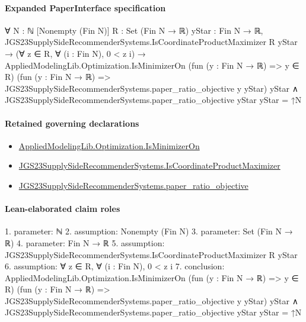 \documentclass[10pt]{article}
\begin{document}
\paragraph{Expanded PaperInterface specification}
\begin{ReviewVerbatim}
∀ {N : ℕ} [Nonempty (Fin N)] {R : Set (Fin N → ℝ)} {yStar : Fin N → ℝ},
  JGS23SupplySideRecommenderSystems.IsCoordinateProductMaximizer R yStar →
    (∀ z ∈ R, ∀ (i : Fin N), 0 < z i) →
      AppliedModelingLib.Optimization.IsMinimizerOn (fun (y : Fin N → ℝ) => y ∈ R)
          (fun (y : Fin N → ℝ) => JGS23SupplySideRecommenderSystems.paper_ratio_objective y yStar) yStar ∧
        JGS23SupplySideRecommenderSystems.paper_ratio_objective yStar yStar = ↑N
\end{ReviewVerbatim}

\paragraph{Retained governing declarations}
\begin{itemize}\raggedright
\item \hyperlink{governing-declaration-797bcd85b4b26271}{Applied\allowbreak{}Modeling\allowbreak{}Lib.\allowbreak{}Optimization.\allowbreak{}Is\allowbreak{}Minimizer\allowbreak{}On}
\item \hyperlink{governing-declaration-de9a7a71192aaf5f}{JGS23\allowbreak{}Supply\allowbreak{}Side\allowbreak{}Recommender\allowbreak{}Systems.\allowbreak{}Is\allowbreak{}Coordinate\allowbreak{}Product\allowbreak{}Maximizer}
\item \hyperlink{governing-declaration-e3228e613009eac0}{JGS23\allowbreak{}Supply\allowbreak{}Side\allowbreak{}Recommender\allowbreak{}Systems.\allowbreak{}paper\_\allowbreak{}ratio\_\allowbreak{}objective}
\end{itemize}
\paragraph{Lean-elaborated claim roles}\begin{ReviewVerbatim}
1. parameter: ℕ
2. assumption: Nonempty (Fin N)
3. parameter: Set (Fin N → ℝ)
4. parameter: Fin N → ℝ
5. assumption: JGS23SupplySideRecommenderSystems.IsCoordinateProductMaximizer R yStar
6. assumption: ∀ z ∈ R, ∀ (i : Fin N), 0 < z i
7. conclusion: AppliedModelingLib.Optimization.IsMinimizerOn (fun (y : Fin N → ℝ) => y ∈ R)
    (fun (y : Fin N → ℝ) => JGS23SupplySideRecommenderSystems.paper_ratio_objective y yStar) yStar ∧
  JGS23SupplySideRecommenderSystems.paper_ratio_objective yStar yStar = ↑N
\end{ReviewVerbatim}
\end{document}
